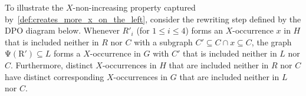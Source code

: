 \begin{example}
    To illustrate the $X$-non-increasing property captured by~\autoref{def:creates_more_x_on_the_left},
    consider the rewriting step defined by the DPO diagram below. Whenever \( R'_i \) (for \( 1 \leq i \leq 4 \)) forms an \( X \)-occurrence $x$ in $H$ that is included neither in \( R \) nor $C$ with a subgraph $C' \subseteq C \cap x \subseteq C$, the graph
    \( \operatorname{\Psi(R')} \subseteq L\) forms a \( X \)-occurrence in $G$ with $C'$ that is included neither in \( L \) nor $C$.
    Furthermore, distinct $X$-occurrences in $H$ that are included neither in \( R \) nor $C$ have distinct corresponding $X$-occurrences in $G$ that are included neither in \( L \) nor $C$.
    \begin{center} 
\end{center}
\end{example}
